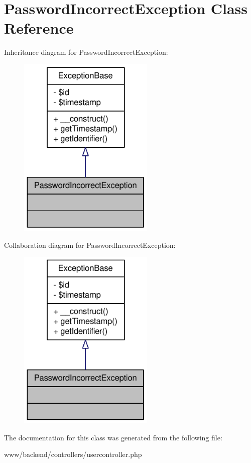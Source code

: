 \hypertarget{classPasswordIncorrectException}{
\section{PasswordIncorrectException Class Reference}
\label{classPasswordIncorrectException}
}


Inheritance diagram for PasswordIncorrectException:\nopagebreak
\begin{figure}[H]
\begin{center}
\leavevmode
\includegraphics[width=184pt]{classPasswordIncorrectException__inherit__graph}
\end{center}
\end{figure}


Collaboration diagram for PasswordIncorrectException:\nopagebreak
\begin{figure}[H]
\begin{center}
\leavevmode
\includegraphics[width=184pt]{classPasswordIncorrectException__coll__graph}
\end{center}
\end{figure}


The documentation for this class was generated from the following file:\begin{DoxyCompactItemize}
\item 
www/backend/controllers/usercontroller.php\end{DoxyCompactItemize}
